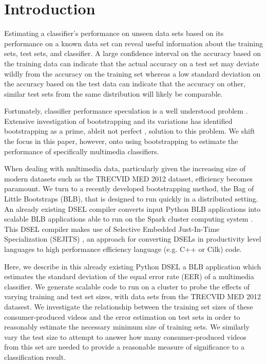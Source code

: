 \section{Introduction}

Estimating a classifier's performance on unseen data sets based on its performance on a known data set can reveal useful information about the training sets, test sets, and classifier. A large confidence interval on the accuracy based on the training data can indicate that the actual accuracy on a test set may deviate wildly from the accuracy on the training set whereas a low standard deviation on the accuracy based on the test data can indicate that the accuracy on other, similar test sets from the same distribution will likely be comparable. 

Fortunately, classifier performance speculation is a well understood problem \cite{fukunaga1989estimation}. 
Extensive investigation of bootstrapping and its variations \cite{efron1979bootstrap,jain1987bootstrap, chernick1985application, sahiner2008classifier} has identified bootstrapping as a prime, ableit not perfect \cite{isaksson2008cross},
solution to this problem. We shift the focus in this paper, however, onto using bootstrapping to estimate the performance of specifically multimedia classifiers. 

When dealing with multimedia data, particularly given the increasing size of modern datasets such as the TRECVID MED 2012 dataset, efficiency becomes paramount. 
We turn to a recently developed bootstrapping method, the Bag of Little Bootstraps (BLB)\cite{kleiner2012big,kleiner2011scalable}, that is designed to run quickly in a distributed setting.
An already existing DSEL compiler converts input Python BLB applications into scalable BLB applications able to run on the Spark cluster computing system \cite{pbirsinger2013}. 
This DSEL compiler makes use of Selective Embedded Just-In-Time Specialization (SEJITS) \cite{Kamil:EECS-2013-1}, an approach for converting DSELs in productivity level languages to high performance efficiency language (e.g. C++ or Cilk) code. 

Here, we describe in this already existing Python DSEL a BLB application which estimates the standard deviation of the equal error rate (EER) of a multimedia classifier. We generate scalable code to run on a cluster to probe the effects of varying training and test set sizes, with data sets from the TRECVID MED 2012 datasest. We investigate the relationship between the training set sizes of these consumer-produced videos and the error estimation on test sets in order to reasonably estimate the necessary minimum size of training sets. We similarly vary the test size to attempt to answer how many consumer-produced videos from this set are needed to provide a reasonable measure of significance to a classification result. 

